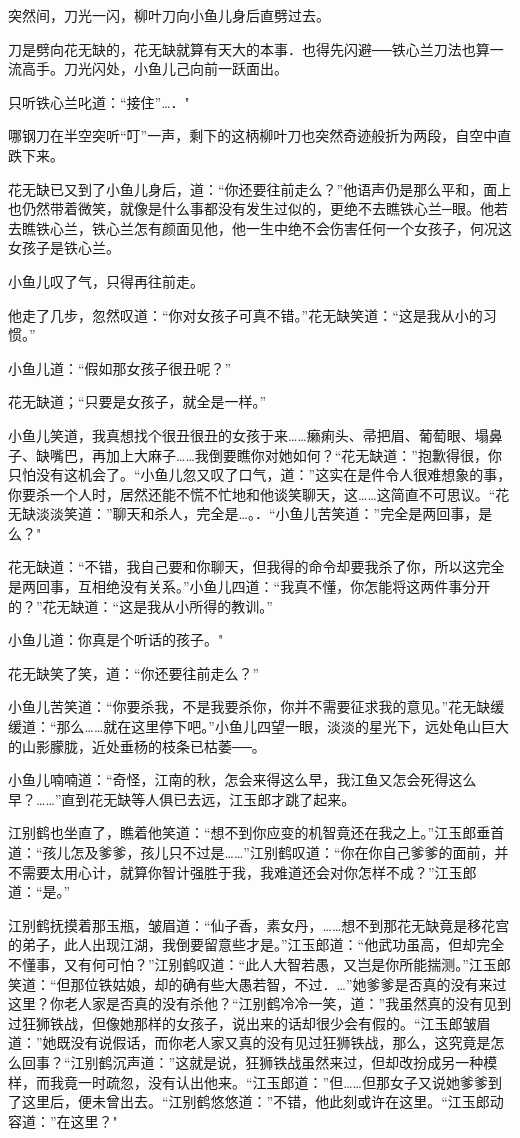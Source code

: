 \documentclass[12pt,oneside]{book}
\begin{document}
突然间，刀光一闪，柳叶刀向小鱼儿身后直劈过去。

刀是劈向花无缺的，花无缺就算有天大的本事．也得先闪避──铁心兰刀法也算一流高手。刀光闪处，小鱼儿己向前一跃面出。

只听铁心兰叱道：``接住''\ldots．"

哪钢刀在半空突听``叮''一声，剩下的这柄柳叶刀也突然奇迹般折为两段，自空中直跌下来。

花无缺已又到了小鱼儿身后，道：``你还要往前走么？''他语声仍是那么平和，面上也仍然带着微笑，就像是什么事都没有发生过似的，更绝不去瞧铁心兰─眼。他若去瞧铁心兰，铁心兰怎有颜面见他，他一生中绝不会伤害任何一个女孩子，何况这女孩子是铁心兰。

小鱼儿叹了气，只得再往前走。

他走了几步，忽然叹道：``你对女孩子可真不错。''花无缺笑道：``这是我从小的习惯。''

小鱼儿道：``假如那女孩子很丑呢？''

花无缺道；``只要是女孩子，就全是一样。''

小鱼儿笑道，我真想找个很丑很丑的女孩于来\ldots\ldots 癞痢头、帚把眉、葡萄眼、塌鼻子、缺嘴巴，再加上大麻子\ldots\ldots 我倒要瞧你对她如何？``花无缺道：''抱歉得很，你只怕没有这机会了。``小鱼儿忽又叹了口气，道：''这实在是件令人很难想象的事，你要杀一个人时，居然还能不慌不忙地和他谈笑聊天，这\ldots\ldots 这简直不可思议。``花无缺淡淡笑道：''聊天和杀人，完全是\ldots。．``小鱼儿苦笑道：''完全是两回事，是么？"

花无缺道：``不错，我自己要和你聊天，但我得的命令却要我杀了你，所以这完全是两回事，互相绝没有关系。''小鱼儿四道：``我真不懂，你怎能将这两件事分开的？''花无缺道：``这是我从小所得的教训。''

小鱼儿道：你真是个听话的孩子。"

花无缺笑了笑，道：``你还要往前走么？''

小鱼儿苦笑道：``你要杀我，不是我要杀你，你并不需要征求我的意见。''花无缺缓缓道：``那么\ldots\ldots 就在这里停下吧。''小鱼儿四望一眼，淡淡的星光下，远处龟山巨大的山影朦胧，近处垂杨的枝条已枯萎──。

小鱼儿喃喃道：``奇怪，江南的秋，怎会来得这么早，我江鱼又怎会死得这么早？\ldots\ldots{}''直到花无缺等人俱已去远，江玉郎才跳了起来。

江别鹤也坐直了，瞧着他笑道：``想不到你应变的机智竟还在我之上。''江玉郎垂首道：``孩儿怎及爹爹，孩儿只不过是\ldots\ldots{}''江别鹤叹道：``你在你自己爹爹的面前，并不需要太用心计，就算你智计强胜于我，我难道还会对你怎样不成？''江玉郎道：``是。''

江别鹤抚摸着那玉瓶，皱眉道：``仙子香，素女丹，\ldots\ldots 想不到那花无缺竟是移花宫的弟子，此人出现江湖，我倒要留意些才是。''江玉郎道：``他武功虽高，但却完全不懂事，又有何可怕？''江别鹤叹道：``此人大智若愚，又岂是你所能揣测。''江玉郎笑道：``但那位铁姑娘，却的确有些大愚若智，不过．\ldots{}''她爹爹是否真的没有来过这里？你老人家是否真的没有杀他？``江别鹤冷冷一笑，道：''我虽然真的没有见到过狂狮铁战，但像她那样的女孩子，说出来的话却很少会有假的。``江玉郎皱眉道：''她既没有说假话，而你老人家又真的没有见过狂狮铁战，那么，这究竟是怎么回事？``江别鹤沉声道：''这就是说，狂狮铁战虽然来过，但却改扮成另一种模样，而我竟一时疏忽，没有认出他来。``江玉郎道：''但\ldots\ldots 但那女子又说她爹爹到了这里后，便未曾出去。``江别鹤悠悠道：''不错，他此刻或许在这里。``江玉郎动容道：''在这里？"
\end{document}
